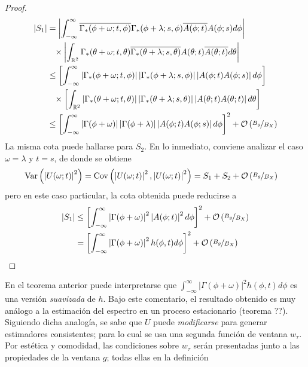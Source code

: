 \documentclass[12pt,letterpaper,draft]{book}
\newcommand{\R}{\mathbb{R}}
\newcommand{\intR}{\int_{-\infty}^{\infty}}
\newcommand{\Var}[1]{\mathrm{Var}\left( #1 \right)}
\newcommand{\Cov}[1]{\mathrm{Cov}\left( #1 \right)}
\newcommand{\abso}[1]{\left| #1 \right|}
\newcommand{\orden}[1]{\mathcal{O}\left( #1 \right)}
\newcommand{\pheq}{\phantom{=}}
\begin{document}
\begin{proof}
\begin{align*}
\abso{S_1} &=
 \abso{ \intR \overline{\Gamma_*(\phi + \omega; t, \phi)} \Gamma_*(\phi+ \lambda; s, \phi)
 \overline{A(\phi; t)} A(\phi; s) d\phi } \\
 &\pheq \times \abso{ \int_{\R^{2}} \Gamma_*(\theta+ \omega; t, \theta) 
  \overline{\Gamma_*(\theta + \lambda; s, \theta)}  
 A(\theta; t)   \overline{A(\theta; t)} d\theta } \\ 
 &\leq
 \left[ \intR \abso{\Gamma_*(\phi + \omega; t, \phi)} \abso{\Gamma_*(\phi+ \lambda; s, \phi)}
 \abso{A(\phi; t) A(\phi; s)} d\phi \right] \\
 &\pheq \times \left[ \int_{\R^{2}} \abso{\Gamma_*(\theta+ \omega; t, \theta)} 
  \abso{\Gamma_*(\theta + \lambda; s, \theta)}  
 \abso{A(\theta; t) A(\theta; t)} d\theta \right] \\ 
 &\leq
 \left[ \intR \abso{\Gamma(\phi + \omega)} \abso{\Gamma(\phi+ \lambda)}
 \abso{A(\phi; t) A(\phi; s)} d\phi \right]^{2} + \orden{\nicefrac{B_g}{B_X}}
\end{align*}
La misma cota puede hallarse para $S_2$. En lo inmediato, conviene analizar el caso $\omega = \lambda$ y $t = s$, de donde se obtiene
\begin{align*}
\Var{\abso{U(\omega; t)}^{2}} &= \Cov{\abso{U(\omega; t)}^{2}, \abso{U(\omega; t)}^{2}} = S_1 + S_2 + \orden{\nicefrac{B_g}{B_X}}
\end{align*}
pero en este caso particular, la cota obtenida puede reducirse a
\begin{align*}
\abso{S_1} & \leq
\left[ \intR \abso{\Gamma(\phi + \omega)}^{2} \abso{A(\phi; t)}^{2} d\phi \right]^{2} + \orden{\nicefrac{B_g}{B_X}} \\
&= 
\left[ \intR \abso{\Gamma(\phi + \omega)}^{2} h(\phi, t) d\phi \right]^{2} + \orden{\nicefrac{B_g}{B_X}}
\end{align*}
\end{proof}

En el teorema anterior puede interpretarse que $\intR \abso{\Gamma(\phi + \omega)}^{2} h(\phi, t) d\phi$ es una versión \textit{suavizada} de $h$.
%
Bajo este comentario, el resultado obtenido es muy análogo a la estimación del espectro en un proceso estacionario (teorema ??).
%
Siguiendo dicha analogía, se sabe que $U$ puede \textit{modificarse} para generar estimadores consistentes; para lo cual se usa una segunda función de ventana $w_\tau$. 
%
Por estética y comodidad, las condiciones sobre $w_\tau$ serán presentadas junto a las propiedades de la ventana $g$; todas ellas en la definición
\end{document}
